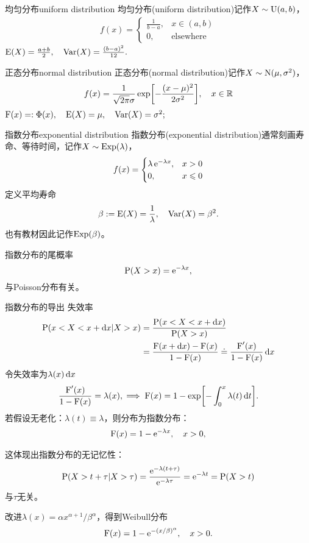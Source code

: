 \fi
\begin{definition}{均匀分布}{uniform distribution}
	均匀分布(uniform distribution)记作$X\sim\operatorname{U}(a,b)$，%
	\begin{align}
		f(x)=\begin{cases}
			\frac1{b-a},&x\in(a,b)\\
			0,&\text{elsewhere}
		\end{cases}
	\end{align}
	$\operatorname{E}(X)=\frac{a+b}2,\quad\operatorname{Var}(X)=\frac{(b-a)^2}{12}.$
\end{definition}
\begin{definition}{正态分布}{normal distribution}
	正态分布(normal distribution)记作$X\sim\operatorname{N}(\mu,\sigma^2)$，%
	\begin{align}
		f(x)=\frac1{\sqrt{2\pi}\sigma}\exp\biggl[-\frac{(x-\mu)^2}{2\sigma^2}\biggr],\quad x\in\mathbb R
	\end{align}
	$\operatorname{F}(x)=:\Phi(x),\quad\operatorname{E}(X)=\mu,\quad\operatorname{Var}(X)=\sigma^2;$
\end{definition}
\begin{definition}{指数分布}{exponential distribution}
	指数分布(exponential distribution)通常刻画寿命、等待时间，记作$X\sim\operatorname{Exp}(\lambda)$，
	\begin{align}
		f(x)=\begin{cases}
			\lambda\mathop{}\!\mathrm{e}^{-\lambda x},&x>0\\
			0,&x\leqslant 0
		\end{cases}
	\end{align}
	定义平均寿命
	\[
		\beta:=\operatorname{E}(X)=\frac1\lambda,\quad\operatorname{Var}(X)=\beta^2.
	\]
	也有教材因此记作$\operatorname{Exp}(\beta)$。
\end{definition}

指数分布的尾概率
\[
	\P(X>x)=\e{-\lambda x},%
\]
与Poisson分布有关。

\begin{example}{指数分布的导出}{}
	失效率
	\begin{align*}
		\operatorname{P}(x<X<x+\mathop{}\!\mathrm{d} x|X>x)&=\frac{\operatorname{P}(x<X<x+\mathop{}\!\mathrm{d} x)}{\operatorname{P}(X>x)}\\
		&=\frac{\operatorname{F}(x+\mathop{}\!\mathrm{d} x)-\operatorname{F}(x)}{1-\operatorname{F}(x)}\doteq\frac{\operatorname{F}'(x)}{1-\operatorname{F}(x)}\mathop{}\!\mathrm{d} x
	\end{align*}
	令失效率为$\lambda(x)\mathop{}\!\mathrm{d} x$
	\[
		\frac{\operatorname{F}'(x)}{1-\operatorname{F}(x)}=\lambda(x),\implies\operatorname{F}(x)=1-\exp\biggl[-\int_0^x\lambda(t)\mathop{}\!\mathrm{d} t\biggr].
	\]
	若假设无老化：$\lambda(t)\equiv\lambda$，则分布为指数分布：
	\begin{align}
		\operatorname{F}(x)=1-\mathop{}\!\mathrm{e}^{-\lambda x},\quad x>0,
	\end{align}

	这体现出指数分布的无记忆性：
	\[
		\operatorname{P}(X>t+\tau|X>\tau)=\frac{\mathop{}\!\mathrm{e}^{-\lambda(t+\tau)}}{\mathop{}\!\mathrm{e}^{-\lambda\tau}}=\mathop{}\!\mathrm{e}^{-\lambda t}=\operatorname{P}(X>t)
	\]
	与$\tau$无关。

	\tcblower
	
	改进$\lambda(x)=\alpha x^{\alpha+1}/\beta^\alpha$，得到Weibull分布
	\begin{align*}
		\operatorname{F}(x)=1-\mathop{}\!\mathrm{e}^{-(x/\beta)^\alpha},\quad x>0.
	\end{align*}
\end{example}

